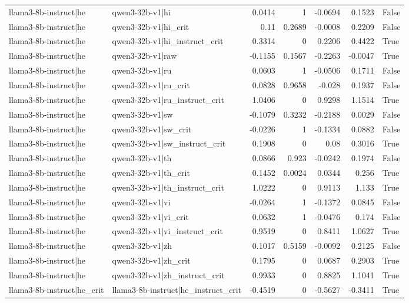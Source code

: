 \begin{table}
\begin{tabular}{l l r r r r l}
llama3-8b-instruct|he & qwen3-32b-v1|hi & 0.0414 & 1 & -0.0694 & 0.1523 & False \\
llama3-8b-instruct|he & qwen3-32b-v1|hi_crit & 0.11 & 0.2689 & -0.0008 & 0.2209 & False \\
llama3-8b-instruct|he & qwen3-32b-v1|hi_instruct_crit & 0.3314 & 0 & 0.2206 & 0.4422 & True \\
llama3-8b-instruct|he & qwen3-32b-v1|raw & -0.1155 & 0.1567 & -0.2263 & -0.0047 & True \\
llama3-8b-instruct|he & qwen3-32b-v1|ru & 0.0603 & 1 & -0.0506 & 0.1711 & False \\
llama3-8b-instruct|he & qwen3-32b-v1|ru_crit & 0.0828 & 0.9658 & -0.028 & 0.1937 & False \\
llama3-8b-instruct|he & qwen3-32b-v1|ru_instruct_crit & 1.0406 & 0 & 0.9298 & 1.1514 & True \\
llama3-8b-instruct|he & qwen3-32b-v1|sw & -0.1079 & 0.3232 & -0.2188 & 0.0029 & False \\
llama3-8b-instruct|he & qwen3-32b-v1|sw_crit & -0.0226 & 1 & -0.1334 & 0.0882 & False \\
llama3-8b-instruct|he & qwen3-32b-v1|sw_instruct_crit & 0.1908 & 0 & 0.08 & 0.3016 & True \\
llama3-8b-instruct|he & qwen3-32b-v1|th & 0.0866 & 0.923 & -0.0242 & 0.1974 & False \\
llama3-8b-instruct|he & qwen3-32b-v1|th_crit & 0.1452 & 0.0024 & 0.0344 & 0.256 & True \\
llama3-8b-instruct|he & qwen3-32b-v1|th_instruct_crit & 1.0222 & 0 & 0.9113 & 1.133 & True \\
llama3-8b-instruct|he & qwen3-32b-v1|vi & -0.0264 & 1 & -0.1372 & 0.0845 & False \\
llama3-8b-instruct|he & qwen3-32b-v1|vi_crit & 0.0632 & 1 & -0.0476 & 0.174 & False \\
llama3-8b-instruct|he & qwen3-32b-v1|vi_instruct_crit & 0.9519 & 0 & 0.8411 & 1.0627 & True \\
llama3-8b-instruct|he & qwen3-32b-v1|zh & 0.1017 & 0.5159 & -0.0092 & 0.2125 & False \\
llama3-8b-instruct|he & qwen3-32b-v1|zh_crit & 0.1795 & 0 & 0.0687 & 0.2903 & True \\
llama3-8b-instruct|he & qwen3-32b-v1|zh_instruct_crit & 0.9933 & 0 & 0.8825 & 1.1041 & True \\
llama3-8b-instruct|he_crit & llama3-8b-instruct|he_instruct_crit & -0.4519 & 0 & -0.5627 & -0.3411 & True \\

\end{tabular}
\end{table}
